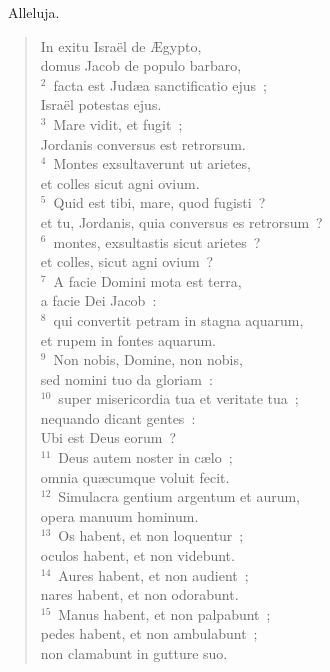 ~\lettrine[lines=10,image=true,loversize=0.05,lraise=-0.03]{A}{}lleluja. \begin{flushleft}\begin{verse}\vspace{6pt}In exitu Isra\"el de \AE gypto,\\ domus Jacob de populo barbaro,\\
${}^{2}$~facta est Jud\ae a sanctificatio ejus~;\\ Isra\"el potestas ejus.\\
${}^{3}$~Mare vidit, et fugit~;\\ Jordanis conversus est retrorsum.\\
${}^{4}$~Montes exsultaverunt ut arietes,\\ et colles sicut agni ovium.\\
${}^{5}$~Quid est tibi, mare, quod fugisti~?\\ et tu, Jordanis, quia conversus es retrorsum~?\\
${}^{6}$~montes, exsultastis sicut arietes~?\\ et colles, sicut agni ovium~?\\
${}^{7}$~A facie Domini mota est terra,\\ a facie Dei Jacob~:\\
${}^{8}$~qui convertit petram in stagna aquarum,\\ et rupem in fontes aquarum.\\
${}^{9}$~Non nobis, Domine, non nobis,\\ sed nomini tuo da gloriam~:\\
${}^{10}$~super misericordia tua et veritate tua~;\\ nequando dicant gentes~:\\ Ubi est Deus eorum~?\\
${}^{11}$~Deus autem noster in c\ae lo~;\\ omnia qu\ae cumque voluit fecit.\\
${}^{12}$~Simulacra gentium argentum et aurum,\\ opera manuum hominum.\\
${}^{13}$~Os habent, et non loquentur~;\\ oculos habent, et non videbunt.\\
${}^{14}$~Aures habent, et non audient~;\\ nares habent, et non odorabunt.\\
${}^{15}$~Manus habent, et non palpabunt~;\\ pedes habent, et non ambulabunt~;\\ non clamabunt in gutture suo.\\

\end{verse}
\end{flushleft}
